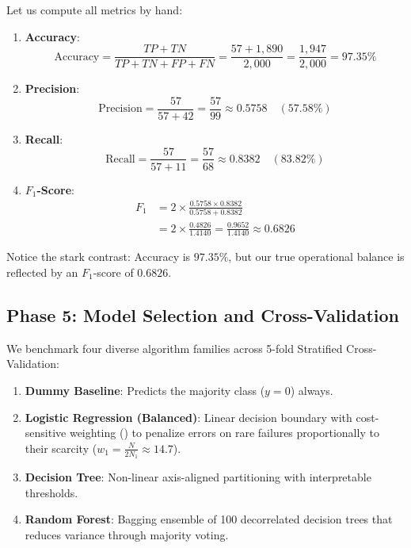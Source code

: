Let us compute all metrics by hand:
\begin{enumerate}
    \item \textbf{Accuracy}:
    \begin{equation*}
    \text{Accuracy} = \frac{TP + TN}{TP + TN + FP + FN} = \frac{57 + 1{,}890}{2{,}000} = \frac{1{,}947}{2{,}000} = \mathbf{97.35\%}
    \end{equation*}

    \item \textbf{Precision}:
    \begin{equation*}
    \text{Precision} = \frac{57}{57 + 42} = \frac{57}{99} \approx \mathbf{0.5758} \quad (57.58\%)
    \end{equation*}

    \item \textbf{Recall}:
    \begin{equation*}
    \text{Recall} = \frac{57}{57 + 11} = \frac{57}{68} \approx \mathbf{0.8382} \quad (83.82\%)
    \end{equation*}

    \item \textbf{$F_1$-Score}:
    \begin{align*}
    F_1 &= 2 \times \frac{0.5758 \times 0.8382}{0.5758 + 0.8382} \\
        &= 2 \times \frac{0.4826}{1.4140} = \frac{0.9652}{1.4140} \approx \mathbf{0.6826}
    \end{align*}
\end{enumerate}

Notice the stark contrast: Accuracy is $97.35\%$, but our true operational balance is reflected by an $F_1$-score of $0.6826$.

\subsection{Phase 5: Model Selection and Cross-Validation}

We benchmark four diverse algorithm families across 5-fold Stratified Cross-Validation:
\begin{enumerate}
    \item \textbf{Dummy Baseline}: Predicts the majority class ($y=0$) always.
    \item \textbf{Logistic Regression (Balanced)}: Linear decision boundary with cost-sensitive weighting () to penalize errors on rare failures proportionally to their scarcity ($w_1 = \frac{N}{2 N_1} \approx 14.7$).
    \item \textbf{Decision Tree}: Non-linear axis-aligned partitioning with interpretable  thresholds.
    \item \textbf{Random Forest}: Bagging ensemble of 100 decorrelated decision trees that reduces variance through majority voting.
\end{enumerate}

